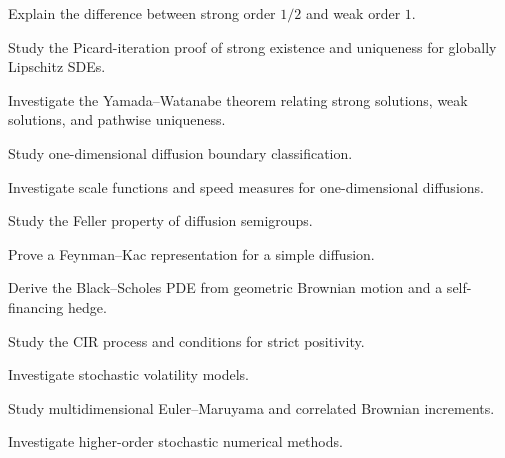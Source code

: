 \begin{exercise}[3]
Explain the difference between strong order \(1/2\) and weak order \(1\).
\end{exercise}

\begin{exercise}[4]
Study the Picard-iteration proof of strong existence and uniqueness for
globally Lipschitz SDEs.
\end{exercise}

\begin{exercise}[4]
Investigate the Yamada--Watanabe theorem relating strong solutions,
weak solutions, and pathwise uniqueness.
\end{exercise}

\begin{exercise}[4]
Study one-dimensional diffusion boundary classification.
\end{exercise}

\begin{exercise}[4]
Investigate scale functions and speed measures for one-dimensional
diffusions.
\end{exercise}

\begin{exercise}[4]
Study the Feller property of diffusion semigroups.
\end{exercise}

\begin{exercise}[4]
Prove a Feynman--Kac representation for a simple diffusion.
\end{exercise}

\begin{exercise}[4]
Derive the Black--Scholes PDE from geometric Brownian motion and a
self-financing hedge.
\end{exercise}

\begin{exercise}[4]
Study the CIR process and conditions for strict positivity.
\end{exercise}

\begin{exercise}[4]
Investigate stochastic volatility models.
\end{exercise}

\begin{exercise}[4]
Study multidimensional Euler--Maruyama and correlated Brownian
increments.
\end{exercise}

\begin{exercise}[4]
Investigate higher-order stochastic numerical methods.
\end{exercise}

